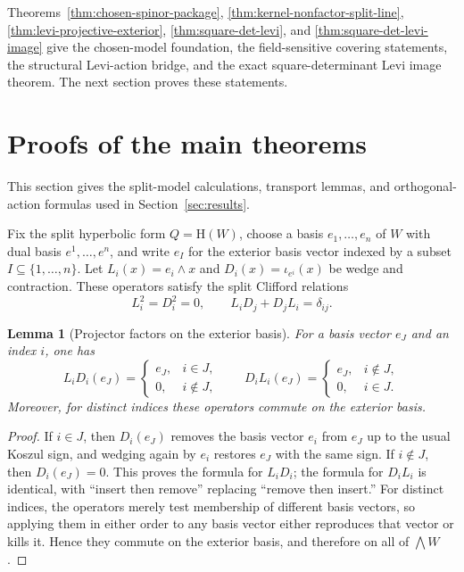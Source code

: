 \documentclass{birkjour}
\theoremstyle{plain}
\newtheorem{lemma}[theorem]{Lemma}
\theoremstyle{definition}
\theoremstyle{remark}
\numberwithin{equation}{section}
\newcommand{\Hyp}{\mathrm{H}}
\begin{document}
Theorems~\ref{thm:chosen-spinor-package},
\ref{thm:kernel-nonfactor-split-line},
\ref{thm:levi-projective-exterior},
\ref{thm:square-det-levi}, and
\ref{thm:square-det-levi-image} give the chosen-model foundation, the
field-sensitive covering statements, the structural Levi-action bridge, and the
exact square-determinant Levi image theorem. The next section proves these
statements.

\section{Proofs of the main theorems}
\label{sec:highlights}

This section gives the split-model calculations, transport lemmas, and
orthogonal-action formulas used in Section~\ref{sec:results}.

Fix the split hyperbolic form $Q=\Hyp(W)$, choose a basis
$e_1,\dots,e_n$ of $W$ with dual basis $e^1,\dots,e^n$, and write
$e_I$ for the exterior basis vector indexed by a subset
$I\subseteq \{1,\dots,n\}$. Let $L_i(x)=e_i\wedge x$ and
$D_i(x)=\iota_{e^i}(x)$ be wedge and contraction. These operators satisfy the
split Clifford relations
\[
  L_i^2=D_i^2=0,
  \qquad
  L_iD_j+D_jL_i=\delta_{ij}.
\]

\begin{lemma}[Projector factors on the exterior basis]
For a basis vector $e_J$ and an index $i$, one has
\[
  L_iD_i(e_J)=
  \begin{cases}
    e_J,& i\in J,\\
    0,& i\notin J,
  \end{cases}
  \qquad
  D_iL_i(e_J)=
  \begin{cases}
    e_J,& i\notin J,\\
    0,& i\in J.
  \end{cases}
\]
Moreover, for distinct indices these operators commute on the exterior basis.
\end{lemma}

\begin{proof}
If $i\in J$, then $D_i(e_J)$ removes the basis vector $e_i$ from $e_J$ up to
the usual Koszul sign, and wedging again by $e_i$ restores $e_J$ with the same
sign. If $i\notin J$, then $D_i(e_J)=0$. This proves the formula for $L_iD_i$;
the formula for $D_iL_i$ is identical, with ``insert then remove'' replacing
``remove then insert.'' For distinct indices, the operators merely test
membership of different basis vectors, so applying them in either order to any
basis vector either reproduces that vector or kills it. Hence they commute on
the exterior basis, and therefore on all of $\bigwedge W$.
\end{proof}
\end{document}
